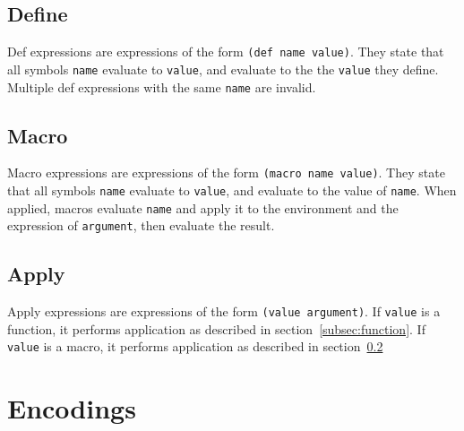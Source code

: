 \documentclass[11pt]{article}
\begin{document}
    \subsection{Define}\label{subsec:def}

    \begin{minipage}{\columnwidth}
        Def expressions are expressions of the form \lstinline{(def name value)}.
        They state that all symbols \texttt{name} evaluate to \texttt{value}, and evaluate to the the \texttt{value} they define.
        Multiple def expressions with the same \texttt{name} are invalid.
    \end{minipage}

    \subsection{Macro}\label{subsec:macro}

    \begin{minipage}{\columnwidth}
        Macro expressions are expressions of the form \lstinline{(macro name value)}.
        They state that all symbols \texttt{name} evaluate to \texttt{value}, and evaluate to the value of \texttt{name}.
        When applied, macros evaluate \texttt{name} and apply it to the environment and the expression of \texttt{argument}, then evaluate the result.
    \end{minipage}

    \subsection{Apply}\label{subsec:apply}

    \begin{minipage}{\columnwidth}
        Apply expressions are expressions of the form \lstinline{(value argument)}.
        If \texttt{value} is a function, it performs application as described in section~\ref{subsec:function}.
        If \texttt{value} is a macro, it performs application as described in section~\ref{subsec:macro}
    \end{minipage}
    \newpage
    \twocolumn

    \section{Encodings}\label{sec:encodings}
\end{document}

